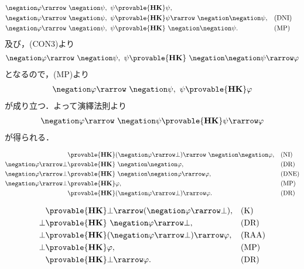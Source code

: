 	\begin{sketch}[CON4]
		\begin{align}
			\negation \varphi \rarrow\ \negation \psi,\ \psi &\provable{\mbox{{\bf HK}}} \psi, \\
			\negation \varphi \rarrow\ \negation \psi,\ \psi &\provable{\mbox{{\bf HK}}} 
				\psi \rarrow\ \negation \negation \psi, && \mbox{(DNI)} \\
			\negation \varphi \rarrow\ \negation \psi,\ \psi &\provable{\mbox{{\bf HK}}} 
				\ \negation \negation \psi. && \mbox{(MP)}
		\end{align}
		及び，(CON3)より
		\begin{align}
			\negation \varphi \rarrow\ \negation \psi,\ \psi \provable{\mbox{{\bf HK}}} 
				\ \negation \negation \psi \rarrow \varphi
		\end{align}
		となるので，(MP)より
		\begin{align}
			\negation \varphi \rarrow\ \negation \psi,\ \psi \provable{\mbox{{\bf HK}}} \varphi
		\end{align}
		が成り立つ．よって演繹法則より
		\begin{align}
			\negation \varphi \rarrow\ \negation \psi \provable{\mbox{{\bf HK}}} \psi \rarrow \varphi
		\end{align}
		が得られる．
		\QED
	\end{sketch}
	
	\begin{sketch}[RAA]
		\begin{align}
			&\provable{\mbox{{\bf HK}}} (\negation \varphi \rarrow \bot) \rarrow\ 
				\negation \negation \varphi, && \mbox{(NI)} \\
			\negation \varphi \rarrow \bot &\provable{\mbox{{\bf HK}}}\ 
				\negation \negation \varphi, && \mbox{(DR)} \\
			\negation \varphi \rarrow \bot &\provable{\mbox{{\bf HK}}}\ 
				\negation \negation \varphi \rarrow \varphi, && \mbox{(DNE)} \\
			\negation \varphi \rarrow \bot &\provable{\mbox{{\bf HK}}} \varphi, && \mbox{(MP)} \\
			&\provable{\mbox{{\bf HK}}} (\negation \varphi \rarrow \bot) \rarrow \varphi. && \mbox{(DR)}
		\end{align}
		\QED
	\end{sketch}
	
	\begin{sketch}[EFQ]
		\begin{align}
			&\provable{\mbox{{\bf HK}}} \bot \rarrow (\negation \varphi \rarrow \bot), && \mbox{(K)} \\
			\bot &\provable{\mbox{{\bf HK}}}\ \negation \varphi \rarrow \bot, && \mbox{(DR)} \\
			\bot &\provable{\mbox{{\bf HK}}} (\negation \varphi \rarrow \bot) \rarrow \varphi,
				&& \mbox{(RAA)} \\
			\bot &\provable{\mbox{{\bf HK}}} \varphi, && \mbox{(MP)} \\
			&\provable{\mbox{{\bf HK}}} \bot \rarrow \varphi. && \mbox{(DR)}
		\end{align}
		\QED
	\end{sketch}
	
